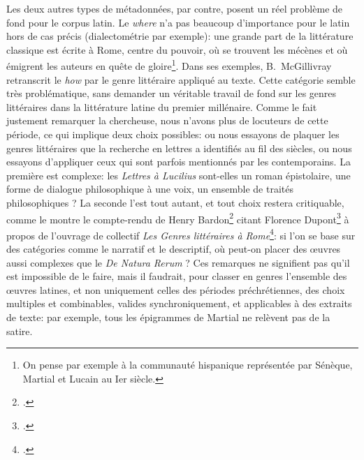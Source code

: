 Les deux autres types de métadonnées, par contre, posent un réel problème de fond pour le corpus latin. Le \textit{where} n'a pas beaucoup d'importance pour le latin hors de cas précis (dialectométrie par exemple): une grande part de la littérature classique est écrite à Rome, centre du pouvoir, où se trouvent les mécènes et où émigrent les auteurs en quête de gloire\footnote{On pense par exemple à la communauté hispanique représentée par Sénèque, Martial et Lucain au Ier siècle.}. Dans ses exemples, B.~McGillivray retranscrit le \textit{how} par le genre littéraire appliqué au texte. Cette catégorie semble très problématique, sans demander un véritable travail de fond sur les genres littéraires dans la littérature latine du premier millénaire. Comme le fait justement remarquer la chercheuse, nous n'avons plus de locuteurs de cette période, ce qui implique deux choix possibles: ou nous essayons de plaquer les genres littéraires que la recherche en lettres a identifiés au fil des siècles, ou nous essayons d'appliquer ceux qui sont parfois mentionnés par les contemporains. La première est complexe: les \textit{Lettres à Lucilius} sont-elles un roman épistolaire, une forme de dialogue philosophique à une voix, un ensemble de traités philosophiques ? La seconde l'est tout autant, et tout choix restera critiquable, comme le montre le compte-rendu de Henry Bardon\footcite{bardon_review_1983} citant Florence Dupont\footcite{dupont_ciceron_1982} à propos de l'ouvrage de collectif \textit{Les Genres littéraires à Rome}\footcite{martin_les_1981}: si l'on se base sur des catégories comme le narratif et le descriptif, où peut-on placer des œuvres aussi complexes que le \textit{De Natura Rerum} ? Ces remarques ne signifient pas qu'il est impossible de le faire, mais il faudrait, pour classer en genres l'ensemble des œuvres latines, et non uniquement celles des périodes préchrétiennes, des choix multiples et combinables, valides synchroniquement, et applicables à des extraits de texte: par exemple, tous les épigrammes de Martial ne relèvent pas de la satire.  

